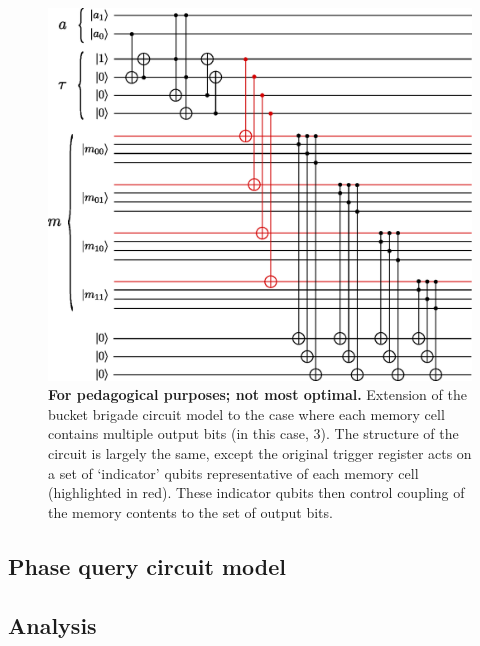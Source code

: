 \documentclass[a4paper,10pt]{article}
\begin{document}
{{\begin{figure}
 \centering
 \includegraphics[scale=0.8]{fig/bb-2qubit-3bitout}
 \caption{\textbf{For pedagogical purposes; not most optimal.} Extension of the bucket brigade circuit model to the case where each memory cell contains multiple output bits (in this case, 3). The structure of the circuit is largely the same, except the original trigger register acts on a set of `indicator' qubits representative of each memory cell (highlighted in red). These indicator qubits then control coupling of the memory contents to the set of output bits.}
\end{figure}


\subsection{Phase query circuit model}

\subsection{Analysis}



}}
\end{document}

